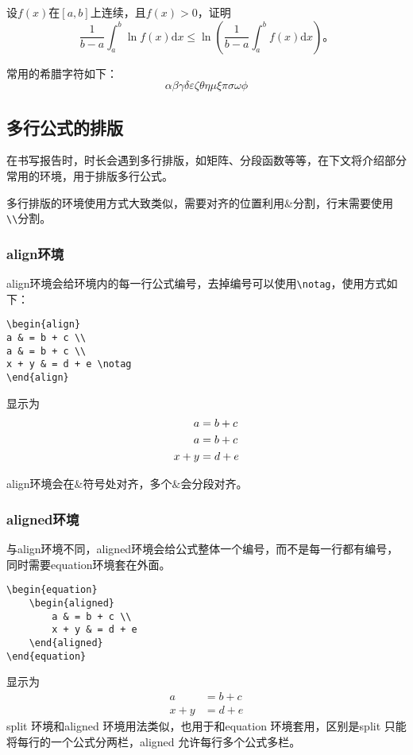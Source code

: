 设$f(x)$在$[a,b]$上连续，且$f(x)>0$，证明
\begin{equation}
\frac{1}{b-a}\int_{a}^{b}\ln f(x)\text{d}x\leqslant \ln \left(\frac{1}{b-a}\int_{a}^{b}f(x)\text{d}x\right)\text{。}
\end{equation}

常用的希腊字符如下：
\[\alpha \beta \gamma \delta \varepsilon \zeta \theta \eta \mu \xi \pi \sigma \omega \phi\]
\subsection{多行公式的排版}
在书写报告时，时长会遇到多行排版，如矩阵、分段函数等等，在下文将介绍部分常用的环境，用于排版多行公式。

多行排版的环境使用方式大致类似，需要对齐的位置利用$\&$分割，行末需要使用\verb|\\|分割。
\subsubsection{align环境}
align环境会给环境内的每一行公式编号，去掉编号可以使用\verb|\notag|，使用方式如下：
\begin{verbatim}
\begin{align}
a & = b + c \\
a & = b + c \\
x + y & = d + e \notag
\end{align}
\end{verbatim}
显示为
\begin{align}
a & = b + c \\
a & = b + c \\
x + y & = d + e \notag
\end{align}

align环境会在$\&$符号处对齐，多个$\&$会分段对齐。
\subsubsection{aligned环境}
与align环境不同，aligned环境会给公式整体一个编号，而不是每一行都有编号，同时需要equation环境套在外面。
\begin{verbatim}
\begin{equation}
	\begin{aligned}
		a & = b + c \\
		x + y & = d + e 
	\end{aligned}
\end{equation}
\end{verbatim}
显示为
\begin{equation}
	\begin{aligned}
		a & = b + c \\
		x + y & = d + e 
	\end{aligned}
\end{equation}
split 环境和aligned 环境用法类似，也用于和equation 环境套用，区别是split 只能
将每行的一个公式分两栏，aligned 允许每行多个公式多栏。
